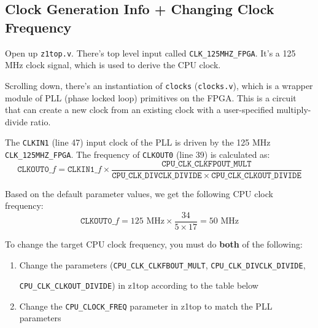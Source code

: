 \subsection{Clock Generation Info + Changing Clock Frequency}
Open up \verb|z1top.v|.
There's top level input called \verb|CLK_125MHZ_FPGA|.
It's a 125 MHz clock signal, which is used to derive the CPU clock.

Scrolling down, there's an instantiation of \verb|clocks| (\verb|clocks.v|), which is a wrapper module of PLL (phase locked loop) primitives on the FPGA. This is a circuit that can create a new clock from an existing clock with a user-specified multiply-divide ratio.

The \verb|CLKIN1| (line 47) input clock of the PLL is driven by the 125 MHz \verb|CLK_125MHZ_FPGA|.
The frequency of \verb|CLKOUT0| (line 39) is calculated as:
\begin{equation*}
  \mathtt{CLKOUT0}\_f = \mathtt{CLKIN1}\_f \times \frac{\mathtt{CPU\_CLK\_CLKFPOUT\_MULT}}{\mathtt{CPU\_CLK\_DIVCLK\_DIVIDE} \times \mathtt{CPU\_CLK\_CLKOUT\_DIVIDE}}
\end{equation*}

Based on the default parameter values, we get the following CPU clock frequency:
\begin{equation*}
  \mathtt{CLKOUT0}\_f = 125 \text{ MHz} \times \frac{34}{5 \times 17} = 50 \text{ MHz}
\end{equation*}

To change the target CPU clock frequency, you must do \textbf{both} of the following:

\begin{enumerate}
\item Change the parameters (\verb|CPU_CLK_CLKFBOUT_MULT|, \verb|CPU_CLK_DIVCLK_DIVIDE|, 

\verb|CPU_CLK_CLKOUT_DIVIDE|) in z1top according to the table below

\item Change the \verb|CPU_CLOCK_FREQ| parameter in z1top to match the PLL parameters

\end{enumerate}

